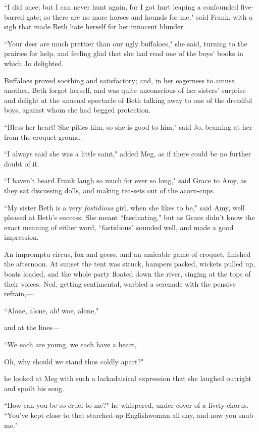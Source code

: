 ``I did once; but I can never hunt again, for I got hurt leaping a
confounded five-barred gate; so there are no more horses and hounds for
me," said Frank, with a sigh that made Beth hate herself for her
innocent blunder.

``Your deer are much prettier than our ugly buffaloes," she said, turning
to the prairies for help, and feeling glad that she had read one of the
boys' books in which Jo delighted.

Buffaloes proved soothing and satisfactory; and, in her eagerness to
amuse another, Beth forgot herself, and was quite unconscious of her
sisters' surprise and delight at the unusual spectacle
of Beth talking away to one of the dreadful boys, against whom she had
begged protection.

``Bless her heart! She pities him, so she is good to him," said Jo,
beaming at her from the croquet-ground.

``I always said she was a little saint," added Meg, as if there could be
no further doubt of it.

``I haven't heard Frank laugh so much for ever so long,"
said Grace to Amy, as they sat discussing dolls, and making tea-sets out
of the acorn-cups.

``My sister Beth is a very \emph{fastidious} girl, when she likes to be,"
said Amy, well pleased at Beth's success. She meant
``fascinating," but as Grace didn't know the exact
meaning of either word, ``fastidious" sounded well, and made a good
impression.

An impromptu circus, fox and geese, and an amicable game of croquet,
finished the afternoon. At sunset the tent was struck, hampers packed,
wickets pulled up, boats loaded, and the whole party floated down the
river, singing at the tops of their voices. Ned, getting sentimental,
warbled a serenade with the pensive refrain,---

``Alone, alone, ah! woe, alone,"

and at the lines---

``We each are young, we each have a heart,

Oh, why should we stand thus coldly apart?"

he looked at Meg with such a lackadaisical expression that she laughed
outright and spoilt his song.

``How can you be so cruel to me?" he whispered, under cover of a lively
chorus. ``You've kept close to that starched-up
Englishwoman all day, and now you snub me."

